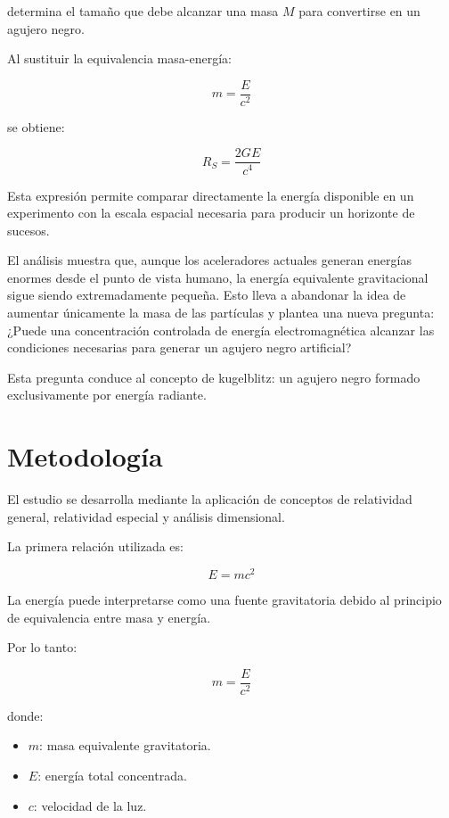 \documentclass[a4paper,10pt,twocolumn]{article}
\begin{document}
determina el tamaño que debe alcanzar una masa $M$ para convertirse en un agujero negro.

Al sustituir la equivalencia masa-energía:

\begin{equation}
m=\frac{E}{c^2}
\end{equation}

se obtiene:

\begin{equation}
R_S=\frac{2GE}{c^4}
\end{equation}

Esta expresión permite comparar directamente la energía disponible en un experimento con la escala espacial necesaria para producir un horizonte de sucesos.

El análisis muestra que, aunque los aceleradores actuales generan energías enormes desde el punto de vista humano, la energía equivalente gravitacional sigue siendo extremadamente pequeña. Esto lleva a abandonar la idea de aumentar únicamente la masa de las partículas y plantea una nueva pregunta: ¿Puede una concentración controlada de energía electromagnética alcanzar las condiciones necesarias para generar un agujero negro artificial?

Esta pregunta conduce al concepto de kugelblitz: un agujero negro formado exclusivamente por energía radiante.

\section{Metodología}

El estudio se desarrolla mediante la aplicación de conceptos de relatividad general, relatividad especial y análisis dimensional.

La primera relación utilizada es:

\begin{equation}
E=mc^2
\end{equation}

La energía puede interpretarse como una fuente gravitatoria debido al principio de equivalencia entre masa y energía.

Por lo tanto:

\begin{equation}
m=\frac{E}{c^2}
\end{equation}

donde:

\begin{itemize}
\item $m$: masa equivalente gravitatoria.
\item $E$: energía total concentrada.
\item $c$: velocidad de la luz.
\end{itemize}
\end{document}
